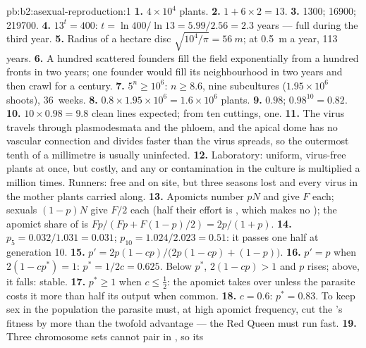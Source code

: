 \begin{solution}{pb:b2:asexual-reproduction:1}
\textbf{1.} $4\times 10^{4}$ plants.
\textbf{2.} $1 + 6\times 2 = 13$.
\textbf{3.} \num{1300}; \num{16900}; \num{219700}.
\textbf{4.} $13^{t} = 400$: $t = \ln 400/\ln 13 = 5.99/2.56 = 2.3$
years --- full during the third year.
\textbf{5.} Radius of a hectare disc $\sqrt{10^{4}/\pi} = \qty{56}{m}$;
at \qty{0.5}{m} a year, \num{113} years.
\textbf{6.} A hundred scattered founders fill the field exponentially
from a hundred fronts in two years; one founder would fill its
neighbourhood in two years and then crawl for a century.
\textbf{7.} $5^{n} \ge 10^{6}$: $n \ge 8.6$, nine subcultures
($1.95\times 10^{6}$ shoots), 36~weeks.
\textbf{8.} $0.8\times 1.95\times 10^{6} = 1.6\times 10^{6}$ plants.
\textbf{9.} $0.98$; $0.98^{10} = 0.82$.
\textbf{10.} $10\times 0.98 = 9.8$ clean lines expected; from ten
cuttings, one.
\textbf{11.} The virus travels through plasmodesmata and the phloem,
and the apical dome has no vascular connection and divides faster
than the virus spreads, so the outermost tenth of a millimetre is
usually uninfected.
\textbf{12.} Laboratory: uniform, virus-free plants at once, but
costly, and any  or contamination in the culture is
multiplied a million times. Runners: free and on site, but three
seasons lost and every virus in the mother plants carried along.
\textbf{13.} Apomicts number $pN$ and give $F$  each; sexuals
$(1 - p)N$ give $F/2$  each (half their effort is , which
makes no ); the apomict share of  is $Fp/(Fp + F(1 - p)/2)
= 2p/(1 + p)$.
\textbf{14.} $p_5 = 0.032/1.031 = 0.031$; $p_{10} = 1.024/2.023 =
0.51$: it passes one half at generation 10.
\textbf{15.} $p' = 2p(1 - cp)/\bigl(2p(1 - cp) + (1 - p)\bigr)$.
\textbf{16.} $p' = p$ when $2(1 - cp^*) = 1$: $p^* = 1/2c = 0.625$.
Below $p^*$, $2(1 - cp) > 1$ and $p$ rises; above, it falls: stable.
\textbf{17.} $p^* \ge 1$ when $c \le \tfrac12$: the apomict takes over
unless the parasite costs it more than half its output when common.
\textbf{18.} $c = 0.6$: $p^* = 0.83$. To keep sex in the population
the parasite must, at high apomict frequency, cut the 's
fitness by more than the twofold advantage --- the Red Queen must
run fast.
\textbf{19.} Three chromosome sets cannot pair in , so its

\end{solution}
